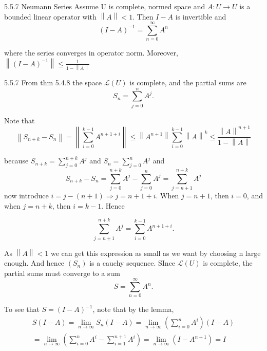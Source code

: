 \documentclass[a4paper,norsk]{article}
\renewcommand{\leq}{\leqslant}
\begin{document}
\begin{theorembox}{5.5.7 Neumann Series}{}
    Assume U is complete, normed space and $ A : U \to U $ is a bounded linear operator with $ \left\lVert A \right\rVert < 1  $. Then $ I - A $ is invertible and
    \[
        \left( I- A \right) ^{-1}  = \sum_{n=0}^{\infty} A^n  
    \]
    
    where the series converges in operator norm. Moreover, $ \left\lVert \left( I - A \right) ^{-1}  \right\rVert \leq \frac{ 1 }{ 1 - \left\lVert A \right\rVert  } $ 

    \begin{proofbox}{5.5.7}{}
        From thm 5.4.8 the space $ \mathcal{L}(U) $ is complete, and the partial sums are
        \[
            S_n = \sum_{j=0}^{n} A^j.
        \]
    
        Note that 
        \[
            \left\lVert S_{n+k} - S_n \right\rVert = \left\lVert \sum_{i=0}^{k-1} A^{n+1+i}  \right\rVert \leq \left\lVert A ^{n+1}  \right\rVert \sum_{i=0}^{k-1} \left\lVert A \right\rVert ^{k}  \leq \frac{ \left\lVert A \right\rVert ^{n+1}  }{ 1 - \left\lVert A \right\rVert  }
        \]

        because $ S_{n+k} = \sum_{j=0}^{n+k} A^j  $ and $ S_n = \sum_{j=0}^{n} A^j  $ and 
        \[
            S_{n+k} - S_n = \sum_{j=0}^{n+k} A^j - \sum_{j=0}^{n} A^j  = \sum_{j=n+1}^{n+k} A^j  
        \]
        now introduce $ i = j - (n+1) \Rightarrow j = n+1+i $. When $ j = n+1 $, then $ i = 0 $, and when $ j = n+k $, then $ i = k-1 $. Hence

        \[
            \sum_{j=n+1}^{n+k} A^j  = \sum_{i=0}^{k-1} A ^{n+1+i}.
        \]
        


        As $ \left\lVert A \right\rVert < 1 $ we can get this expression as small as we want by choosing n large enough. And hence $ \left( S_n \right)  $ is a cauchy sequence. SInce $ \mathcal{L}(U) $ is complete, the partial sums must converge to a sum 
        \[
            S = \sum_{n=0}^{\infty} A^n.
        \]

        To see that $ S = \left( I-A \right) ^{-1}   $, note that by the lemma, 
        \begin{align*}
            S \left( I - A \right) = \lim_{n \to \infty} S_n \left( I - A \right) = \lim_{n \to \infty} \left( \sum_{i=0}^{n} A^i  \right) \left( I - A \right) \\
            = \lim_{n \to \infty} \left( \sum_{i=0}^{n} A ^{i} - \sum_{i=1}^{n+1} A ^{i} \right) = \lim_{n \to \infty} \left( I - A ^{n+1}  \right)  = I
        \end{align*}
                

\end{proofbox}
\end{theorembox}
\end{document}
